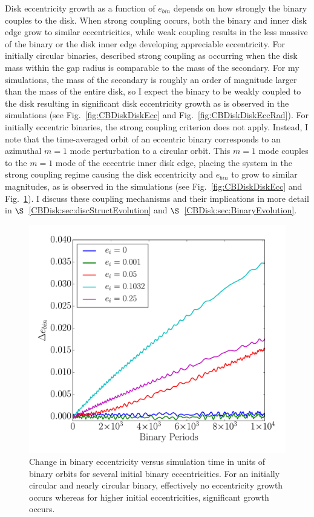 Disk eccentricity growth as a function of $e_{bin}$ depends on how strongly the binary couples to the disk.  When strong coupling occurs, both the binary and inner disk edge grow to similar eccentricities, while weak coupling results in the less massive of the binary or the disk inner edge developing appreciable eccentricity.  For initially circular binaries, \citet{Papaloizou2001} described strong coupling as occurring when the disk mass within the gap radius is comparable to the mass of the secondary.  For my simulations, the mass of the secondary is roughly an order of magnitude larger than the mass of the entire disk, so I expect the binary to be weakly coupled to the disk resulting in significant disk eccentricity growth as is observed in the simulations (see Fig.~\ref{fig:CBDiskDiskEcc} and Fig.~\ref{fig:CBDiskDiskEccRad}).  For initially eccentric binaries, the \citet{Papaloizou2001} strong coupling criterion does not apply.  Instead, I note that the time-averaged orbit of an eccentric binary corresponds to an azimuthal $m = 1$ mode perturbation to a circular orbit.  This $m = 1$ mode couples to the $m = 1$ mode of the eccentric inner disk edge, placing the system in the strong coupling regime causing the disk eccentricity and $e_{bin}$ to grow to similar magnitudes, as is observed in the simulations (see Fig.~\ref{fig:CBDiskDiskEcc} and Fig.~\ref{fig:CBDiskBinEcc}).  I discuss these coupling mechanisms and their implications in more detail in  $\S$~\ref{CBDisk:sec:discStructEvolution} and $\S$~\ref{CBDisk:sec:BinaryEvolution}.

\begin{figure}
	\includegraphics[width=\columnwidth]{f4}
    \caption{Change in binary eccentricity versus simulation time in units of binary orbits for several initial
binary eccentricities. For an initially circular and nearly circular binary, effectively no eccentricity growth occurs whereas 
for higher initial eccentricities, significant growth occurs.}
    \label{fig:CBDiskBinEcc}
\end{figure}

